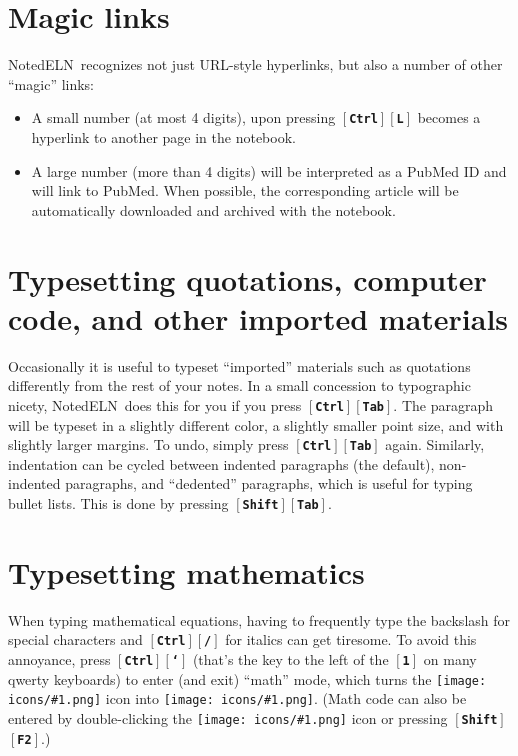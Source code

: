 \documentclass[11pt]{report}
\def\keystroke#1{$\left[\right.\!${\tt\bfseries #1}$\!\left.\right]$}
\def\key#1{\keystroke{#1}}
\def\keycombo#1#2{\keystroke{#1}\keystroke{#2}}
\def\keycontrol#1{\keycombo{Ctrl}{#1}}
\def\keyshift#1{\keycombo{Shift}{#1}}
\def\icon#1{\raise-2pt\hbox{\texttt{[image: icons/\#1.png]}}}
\newcommand{\NotedELN}{NotedELN} %
\begin{document}
\section{Magic links}

\NotedELN\ recognizes not just URL-style hyperlinks, but also a number of
other ``magic'' links:
\begin{itemize}
\item A small number (at most 4 digits), upon pressing \keycontrol{L}
becomes a hyperlink to another page in the notebook.
\item A large number (more than 4 digits)
will be interpreted as a PubMed ID and will link to PubMed. When
possible, the corresponding article will be automatically downloaded
and archived with the notebook.
\end{itemize}

\section{Typesetting quotations, computer code, and other imported materials}

Occasionally it is useful to typeset ``imported'' materials such as
quotations differently from the rest of your notes. In a small
concession to typographic nicety, \NotedELN\ does this for you if you press
\keycontrol{Tab}.  The paragraph will be typeset in a slightly
different color, a slightly smaller point size, and with slightly
larger margins. To undo, simply press \keycontrol{Tab}
again. Similarly, indentation can be cycled between indented
paragraphs (the default), non-indented paragraphs, and ``dedented''
paragraphs, which is useful for typing bullet lists. This is done by
pressing \keyshift{Tab}.

\section{Typesetting mathematics}

When typing mathematical equations, having to frequently type the backslash for special characters and \keycontrol{/} for
italics can get tiresome. To avoid this annoyance, press
\keycontrol{`} (that's the key to the left of the \key{1} on many
qwerty keyboards) to enter (and exit) ``math'' mode, which turns the
\icon{type} icon into \icon{type-math}. (Math code can
also be entered by double-clicking the \icon{type} icon
or pressing \keyshift{F2}.)
\end{document}
